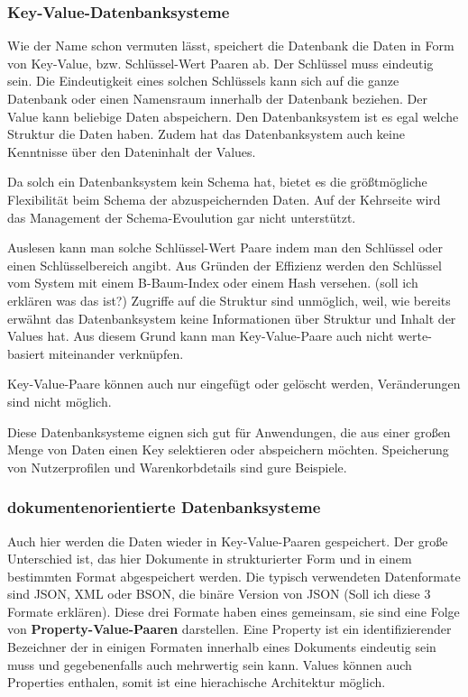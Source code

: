 \begin{flushleft}
\subsubsection{Key-Value-Datenbanksysteme}

Wie der Name schon vermuten lässt, speichert die Datenbank die Daten in Form von Key-Value, bzw. Schlüssel-Wert Paaren ab. Der Schlüssel muss eindeutig sein. Die Eindeutigkeit eines solchen Schlüssels kann sich auf die ganze Datenbank oder einen Namensraum innerhalb der Datenbank beziehen. Der Value kann beliebige Daten abspeichern. Den Datenbanksystem ist es egal welche Struktur die Daten haben. Zudem hat das Datenbanksystem auch keine Kenntnisse über den Dateninhalt der Values.

Da solch ein Datenbanksystem kein Schema hat, bietet es die größtmögliche Flexibilität beim Schema der abzuspeichernden Daten. Auf der Kehrseite wird das Management der Schema-Evoulution gar nicht unterstützt.

Auslesen kann man solche Schlüssel-Wert Paare indem man den Schlüssel oder einen Schlüsselbereich angibt. Aus Gründen der Effizienz werden den Schlüssel vom System mit einem B-Baum-Index oder einem Hash versehen. (soll ich erklären was das ist?)
Zugriffe auf die Struktur sind unmöglich, weil, wie bereits erwähnt das Datenbanksystem keine Informationen über Struktur und Inhalt der Values hat. Aus diesem Grund kann man Key-Value-Paare auch nicht werte-basiert miteinander verknüpfen.

Key-Value-Paare können auch nur eingefügt oder gelöscht werden, Veränderungen sind nicht möglich.

Diese Datenbanksysteme eignen sich gut für Anwendungen, die aus einer großen Menge von Daten einen Key selektieren oder abspeichern möchten. Speicherung von Nutzerprofilen und Warenkorbdetails sind gure Beispiele.

\subsubsection{dokumentenorientierte Datenbanksysteme}

Auch hier werden die Daten wieder in Key-Value-Paaren gespeichert. Der große Unterschied ist, das hier Dokumente in strukturierter Form und in einem bestimmten Format abgespeichert werden. Die typisch verwendeten Datenformate sind JSON, XML oder BSON, die binäre Version von JSON (Soll ich diese 3 Formate erklären). Diese drei Formate haben eines gemeinsam, sie sind eine Folge von \textbf{Property-Value-Paaren} darstellen. Eine Property ist ein identifizierender Bezeichner der in einigen Formaten innerhalb eines Dokuments eindeutig sein muss und gegebenenfalls auch mehrwertig sein kann. Values können auch Properties enthalen, somit ist eine hierachische Architektur möglich.


\end{flushleft}
